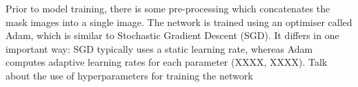 \documentclass[a4paper]{article}
\begin{document}
\begin{figure}[h]
\begin{minipage}{0.45\textwidth}
\centering
{}
\end{minipage}
\hspace{1cm}
\begin{minipage}{0.45\textwidth}
\centering
{}
\end{minipage}
\end{figure}

Prior to model training, there is some pre-processing which concatenates the mask images into a single image. The network is trained using an optimiser called Adam, which is similar to Stochastic Gradient Descent (SGD). It differs in one important way: SGD typically uses a static learning rate, whereas Adam computes adaptive learning rates for each parameter (XXXX, XXXX). Talk about the use of hyperparameters for training the network

\newpage
\end{document}

